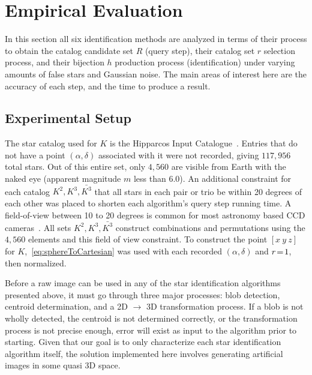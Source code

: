 \newcommand{\AVG}{\mathit{AVG}}

\section{Empirical Evaluation}\label{sec:empiricalEvaluation}
In this section all six identification methods are analyzed in terms of their process to obtain the catalog candidate
set $R$ (query step), their catalog set $r$ selection process, and their bijection $h$ production process
(identification) under varying amounts of false stars and Gaussian noise.
The main areas of interest here are the accuracy of each step, and the time to produce a result.


\subsection{Experimental Setup}\label{subsec:experimentalSetup}
The star catalog used for $K$ is the Hipparcos Input Catalogue~\cite{perryman:hipparcosCatalogue}.
Entries that do not have a point $\left( \alpha, \delta \right)$ associated with it were not recorded, giving
$117{,}956$ total stars.
Out of this entire set, only $4{,}560$ are visible from Earth with the naked eye (apparent magnitude $m$ less than 6.0).
An additional constraint for each catalog $K^2, K^3, \bar{K^3}$ that all stars in each pair or trio be within 20
degrees of each other was placed to shorten each algorithm's query step running time.
A field-of-view between 10 to 20 degrees is common for most astronomy based CCD
cameras~\cite{mortari:pyramidIdentification}.
All sets $K^2, K^3, \bar{K^3}$ construct combinations and permutations using the $4{,}560$ elements and this field
of view constraint.
To construct the point $[ x \ y \ z ]$ for $K$,~\autoref{eq:sphereToCartesian} was used with
each recorded $\left(\alpha, \delta \right)$ and $r \!=\! 1$, then normalized.

Before a raw image can be used in any of the star identification algorithms presented above, it must go through
three major processes: blob detection, centroid determination, and a 2D $\rightarrow$ 3D transformation process.
If a blob is not wholly detected, the centroid is not determined correctly, or the transformation process
is not precise enough, error will exist as input to the algorithm prior to starting.
Given that our goal is to only characterize each star identification algorithm itself, the solution implemented here
involves generating artificial images in some quasi 3D space.

